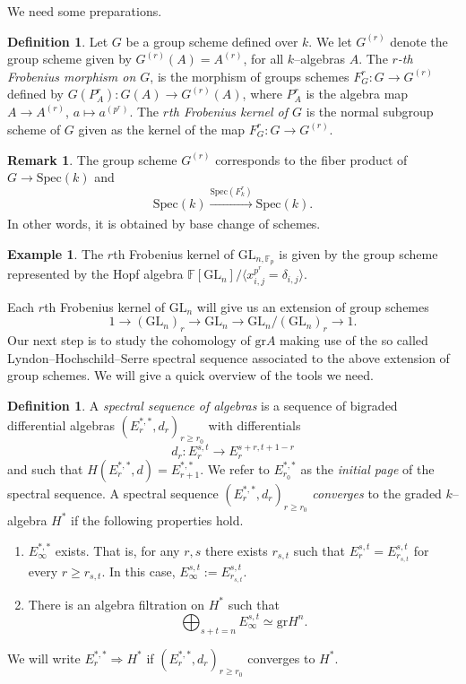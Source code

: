 \documentclass{article}
\theoremstyle{plain}
\theoremstyle{definition}
\newtheorem{Def}[Th]{Definition}
\newtheorem{Rem}[Th]{Remark}
\newtheorem{Ex}[Th]{Example}
\newcommand{\GL}{\mathrm{GL}}
\begin{document}
We need some preparations. 

\begin{Def}
  Let $G$ be a group scheme defined over $k$. We let $G^{(r)}$ denote the group scheme given by $G^{(r)}(A)=A^{(r)}$, for all $k$--algebras $A$. The \textit{$r$-th Frobenius morphism on $G$}, is the morphism of groups schemes $F_G^r\colon G\to G^{(r)}$ defined by $G(P^r_A)\colon G(A)\to G^{(r)}(A)$, where $P^r_A$ is the algebra map $A\to A^{(r)}$, $a\mapsto a^{(p^r)}$.   The \textit{$r$th Frobenius kernel of $G$} is the normal subgroup scheme of $G$ given as the kernel of the map $F_G^r\colon G\to G^{(r)}$. 
\end{Def}

\begin{Rem}
    The group scheme $G^{(r)}$ corresponds to the fiber product of $G\to \mathrm{Spec}(k)$ and 
    \[
    \mathrm{Spec}(k)\xrightarrow[]{\mathrm{Spec}(F^r_k)}\mathrm{Spec}(k).
    \]
    In other words, it is obtained by base change of schemes. 
\end{Rem}

\begin{Ex}
    The $r$th Frobenius kernel of $\GL_{n,{\mathbb{F}_p}}$ is given by the group scheme represented by the Hopf algebra $\mathbb{F}[\GL_n]/\langle x_{i,j}^{p^r}=\delta_{i,j}\rangle.$
\end{Ex}
 

Each $r$th Frobenius kernel of $\GL_n$ will give us an extension of group schemes 
\begin{equation}\label{Extension of group schemes by Frobenius kernels}
  1\to   (\GL_n)_r \to \GL_n\to \GL_n/ (\GL_n)_r \to 1.
\end{equation} 
Our next step is to study the cohomology of $\mathrm{gr}A$ making use of the so called Lyndon–Hochschild–Serre spectral sequence associated to the above extension of group schemes. We will give a quick overview of the tools we need. 

\begin{Def}
    A \textit{spectral sequence of algebras} is a sequence of bigraded differential algebras $(E^{\ast,\ast}_r,d_r)_{r\geq r_0}$ with differentials 
    \[d_r\colon E^{s,t}_r\to E^{s+r,t+1-r}_r\]
    and such that $H(E^{\ast,\ast}_r,d)=E^{\ast,\ast}_{r+1}.$ We refer to $E^{\ast,\ast}_{r_0}$ as the \textit{initial page} of the spectral sequence. A spectral sequence  $(E^{\ast,\ast}_r,d_r)_{r\geq r_0}$ \textit{converges} to the graded $k$--algebra $H^\ast$ if the following properties hold. 
    \begin{enumerate}
        \item $E^{\ast,\ast}_\infty$ exists. That is, for any $r,s$ there exists $r_{s,t}$ such that $E^{s,t}_r=E^{s,t}_{r_{s,t}}$ for every $r\geq r_{s,t}$. In this case, $E^{s,t}_\infty:=E^{s,t}_{r_{s,t}}$.
        \item There is an algebra filtration on $H^\ast$ such that 
        \[\bigoplus_{s+t=n}E^{s,t}_\infty\simeq\mathrm{gr}H^n.\] 
    \end{enumerate}
     We will write $E^{\ast,\ast}_r\Rightarrow H^\ast$ if $(E^{\ast,\ast}_r,d_r)_{r\geq r_0}$ converges to $H^\ast$.
\end{Def}
\end{document}
